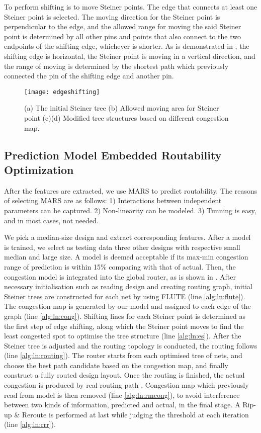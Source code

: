 To perform shifting is to move Steiner points. The edge that connects at least one Steiner point is selected. The moving direction for the Steiner point is perpendicular to the edge, and the allowed range for moving the said Steiner point is determined by all other pins and points that also connect to the two endpoints of the shifting edge, whichever is shorter. As is demonstrated in , the shifting edge is horizontal, the Steiner point is moving in a vertical direction, and the range of moving is determined by the shortest path which previously connected the pin of the shifting edge and another pin. 
\begin{figure}[htbp]
    \centerline{\texttt{[image: edgeshifting]}}
    \caption{(a) The initial Steiner tree (b) Allowed moving area for Steiner point (c)(d) Modified tree structures based on different congestion map.}
    \label{fig:edgeshifting}
\end{figure}

\subsection{Prediction Model Embedded Routability Optimization}
After the features are extracted, we use MARS \cite{MARS} to predict routability. The reasons of selecting MARS are as follows: 1) Interactions between independent parameters can be captured. 2) Non-linearity can be modeled. 3) Tunning is easy, and in most cases, not needed. 

We pick a median-size design and extract corresponding features.
After a model is trained, we select as testing data three other designs with respective small median and large size.
A model is deemed acceptable if its max-min congestion range of prediction is within 15\% comparing with that of actual.
Then, the congestion model is integrated into the global router, as is shown in .
After necessary initialisation such as reading design and creating routing graph, initial Steiner trees are constructed for each net by using FLUTE \cite{FLUTE} (line \ref*{alg:ln:flute}).
The congestion map is generated by our model and assigned to each edge of the graph (line \ref*{alg:ln:cong}).
Shifting lines for each Steiner point is determined as the first step of edge shifting,
along which the Steiner point moves to find the least congested spot to optimise the tree structure (line \ref*{alg:ln:es}).
After the Steiner tree is adjusted and the routing topology is conducted, the routing follows (line \ref*{alg:ln:routing}).
The router starts from each optimised tree of nets, and choose the best path candidate based on the congestion map, and finally construct a fully routed design layout.
Once the routing is finished, the actual congestion is produced by real routing path
. Congestion map which previously read from model is then removed (line \ref*{alg:ln:rmcong}), to avoid interference between two kinds of information, predicted and actual, in the final stage.
A Rip-up \& Reroute is performed at last while judging the threshold at each iteration (line \ref*{alg:ln:rrr}).


